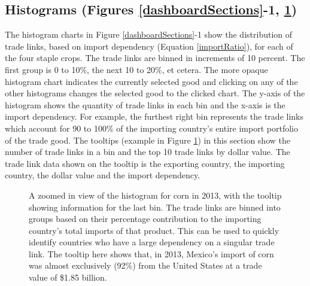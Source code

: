 		\subsection{Histograms (Figures \ref{dashboardSections}-1, \ref{histogram})}
			The histogram charts in Figure \ref{dashboardSections}-1 show the distribution of trade links, based on import dependency (Equation \ref{importRatio}), for each of the four staple crops. The trade links are binned in increments of 10 percent. The first group is 0 to 10\%, the next 10 to 20\%, et cetera. The more opaque histogram chart indicates the currently selected good and clicking on any of the other histograms changes the selected good to the clicked chart. The y-axis of the histogram shows the quantity of trade links in each bin and the x-axis is the import dependency. For example, the furthest right bin represents the trade links which account for 90 to 100\% of the importing country's entire import portfolio of the trade good. The tooltips (example in Figure \ref{histogram}) in this section show the number of trade links in a bin and the top 10 trade links by dollar value. The trade link data shown on the tooltip is the exporting country, the importing country, the dollar value and the import dependency.\par
			\begin{figure}[htb]
				\caption[HISTOGRAM FOR CORN IN 2013]{A zoomed in view of the histogram for corn in 2013, with the tooltip showing information for the last bin. The trade links are binned into groups based on their percentage contribution to the importing country's total imports of that product. This can be used to quickly identify countries who have a large dependency on a singular trade link. The tooltip here shows that, in 2013, Mexico's import of corn was almost exclusively (92\%) from the United States at a trade value of \$1.85 billion.}
				\label{histogram}
			\end{figure}
